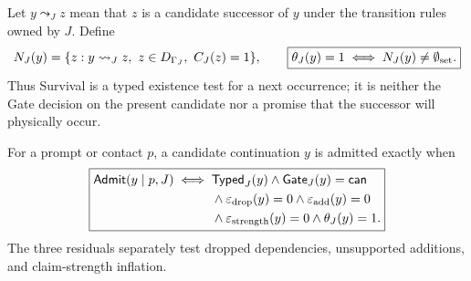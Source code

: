\documentclass[10pt]{article}
\begin{document}
Let $y\leadsto_J z$ mean that $z$ is a candidate successor of $y$ under the transition rules owned by $J$. Define
\begin{equation}
N_J(y)=\{z:y\leadsto_J z,\ z\in D_{\Gamma_J},\ C_J(z)=1\},
\qquad
\boxed{\theta_J(y)=1\iff N_J(y)\ne\emptyset_{\rm set}.}
\label{eq:survivaloperator}
\end{equation}
Thus Survival is a typed existence test for a next occurrence; it is neither the Gate decision on the present candidate nor a promise that the successor will physically occur.

For a prompt or contact $p$, a candidate continuation $y$ is admitted exactly when
\begin{equation}
\boxed{
\begin{aligned}
\mathsf{Admit}(y\mid p,J)\iff{}&\mathsf{Typed}_{J}(y)
\land\mathsf{Gate}_{J}(y)=\mathsf{can}\\
&\land\varepsilon_{\rm drop}(y)=0
\land\varepsilon_{\rm add}(y)=0\\
&\land\varepsilon_{\rm strength}(y)=0
\land\theta_J(y)=1.
\end{aligned}}
\end{equation}
The three residuals separately test dropped dependencies, unsupported additions, and claim-strength inflation.
\end{document}
